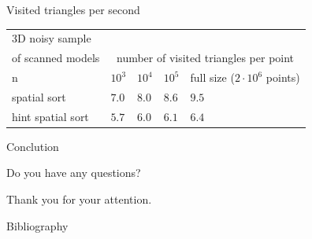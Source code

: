 \documentclass{beamer}
\begin{document}
\begin{frame}{Visited triangles per second}
\begin{tabular}{|l||l|l|l|l|}
\hline
3D noisy sample \\
of scanned models& \multicolumn{4}{|c|}{number of visited triangles per point}\\
 \hline \hline
    n & $10^3$ & $10^4$ & $10^5$ & full size ($2 \cdot 10^6$ points)\\\hline
    spatial sort & $7.0$ & $8.0$ & $8.6$ & $9.5$\\\hline
    hint spatial sort & $5.7$ & $6.0$ & $6.1$ & $6.4$\\\hline
\end{tabular}
\end{frame}

\begin{frame}{Conclution}

\end{frame}

\begin{frame}
\centering
\huge{Do you have any questions?}\\
\pause
\vspace*{1.5cm}
\centerline{\large{Thank you for your attention.}}
\end{frame}

\begin{frame}{Bibliography}
  
\nocite{*}

\end{frame}
\end{document}
